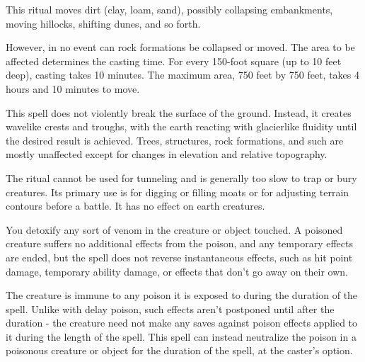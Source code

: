 \spellrng{\rnglong}
\begin{spelleffect}
This ritual moves dirt (clay, loam, sand), possibly collapsing embankments, moving hillocks, shifting dunes, and so forth.
\par However, in no event can rock formations be collapsed or moved. The area to be affected determines the casting time. For every 150-foot square (up to 10 feet deep), casting takes 10 minutes. The maximum area, 750 feet by 750 feet, takes 4 hours and 10 minutes to move.
\par This spell does not violently break the surface of the ground. Instead, it creates wavelike crests and troughs, with the earth reacting with glacierlike fluidity until the desired result is achieved. Trees, structures, rock formations, and such are mostly unaffected except for changes in elevation and relative topography.
\end{spelleffect}
\begin{spellnotes}
The ritual cannot be used for tunneling and is generally too slow to trap or bury creatures. Its primary use is for digging or filling moats or for adjusting terrain contours before a battle. It has no effect on earth creatures.
\end{spellnotes}

\begin{spelleffect}
You detoxify any sort of venom in the creature or object touched. A poisoned  creature suffers no additional effects from  the poison, and any temporary effects are ended, but the spell does not reverse  instantaneous effects, such as hit point  damage, temporary ability damage, or  effects that don't go away on their own.
\par The creature is immune to any poison it  is exposed to during the duration of the  spell. Unlike with delay poison, such effects aren't postponed until after the duration - the creature need not make any saves  against poison effects applied to it during  the length of the spell. This spell can instead neutralize the  poison in a poisonous creature or object  for the duration of the spell, at the caster's  option.
\end{spelleffect}

